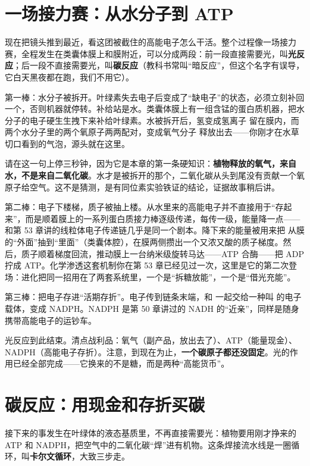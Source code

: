 \section{一场接力赛：从水分子到 ATP}

现在把镜头推到最近，看这团被截住的高能电子怎么干活。整个过程像一场接力赛，全程发生在类囊体膜上和膜附近，可以分成两段：前一段直接需要光，叫\textbf{光反应}；后一段不直接需要光，叫\textbf{碳反应}（教科书常叫“暗反应”，但这个名字有误导，它白天黑夜都在跑，我们不用它）。

第一棒：水分子被拆开。叶绿素失去电子后变成了“缺电子”的状态，必须立刻补回一个，否则机器就停转。补给站是水。类囊体膜上有一组含锰的蛋白质机器，把水分子的电子硬生生拽下来补给叶绿素。水被拆开后，氢变成氢离子  留在膜内，而两个水分子里的两个氧原子两两配对，变成氧气分子  释放出去——你刚才在水草切口看到的气泡，源头就在这里。

请在这一句上停三秒钟，因为它是本章的第一条硬知识：\textbf{植物释放的氧气，来自水，不是来自二氧化碳}。水才是被拆开的那个，二氧化碳从头到尾没有贡献一个氧原子给空气。这不是猜测，是有同位素实验铁证的结论，证据故事稍后讲。

第二棒：电子下楼梯，质子被抽上楼。从水里来的高能电子并不直接用于“存起来”，而是顺着膜上的一系列蛋白质接力棒逐级传递，每传一级，能量降一点——和第 53 章讲的线粒体电子传递链几乎是同一个剧本。降下来的能量被用来把  从膜的“外面”抽到“里面”（类囊体腔），在膜两侧攒出一个又浓又酸的质子梯度。然后，质子顺着梯度回流，推动膜上一台纳米级旋转马达——ATP 合酶——把 ADP 拧成 ATP。化学渗透这套机制你在第 53 章已经见过一次，这里是它的第二次登场：进化把同一招用在了两套系统里，一个是“拆糖放能”，一个是“借光充能”。

第三棒：把电子存进“活期存折”。电子传到链条末端，和  一起交给一种叫  的电子载体，变成 NADPH。NADPH 是第 50 章讲过的 NADH 的“近亲”，同样是随身携带高能电子的运钞车。

光反应到此结束。清点战利品：氧气（副产品，放出去了）、ATP（能量现金）、NADPH（高能电子存折）。注意，到现在为止，\textbf{一个碳原子都还没固定}。光的作用已经全部完成——它换来的不是糖，而是两种“高能货币”。

\section{碳反应：用现金和存折买碳}

接下来的事发生在叶绿体的液态基质里，不再直接需要光：植物要用刚才挣来的 ATP 和 NADPH，把空气中的二氧化碳“焊”进有机物。这条焊接流水线是一圈循环，叫\textbf{卡尔文循环}，大致三步走。

